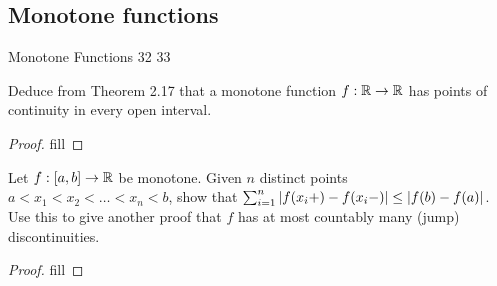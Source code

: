\subsection{Monotone functions}

Monotone Functions
32
33

\begin{exercise}{32}
Deduce from Theorem 2.17 that a monotone function $f:\mathbb{R}\to\mathbb{R}$ has points of continuity in every open interval.
\end{exercise}
\begin{proof}
fill
\end{proof} 

\begin{exercise}{33}
Let $f:[a,b]\to\mathbb{R}$ be monotone. Given $n$ distinct points $a<x_1<x_2<\dots<x_n<b$, show that $\sum_{i=1}^n\left\lvert f(x_i+)-f(x_i-)\right\rvert\leq \left\lvert f(b)-f(a)\right\rvert$. Use this to give another proof that $f$ has at most countably many (jump) discontinuities.
\end{exercise}
\begin{proof}
fill
\end{proof} 